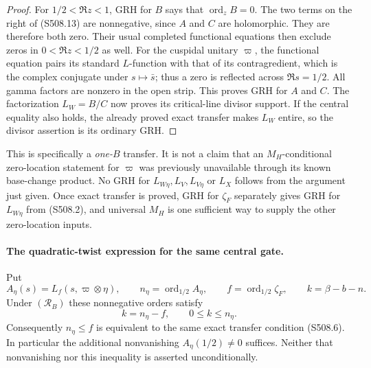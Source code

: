 \begin{proof}
For $1/2<\Re z<1$, GRH for $B$ says that
$\operatorname{ord}_z B=0$.  The two terms on the right of
(S508.13) are nonnegative, since $A$ and $C$ are holomorphic.
They are therefore both zero.  Their usual completed functional
equations then exclude zeros in $0<\Re z<1/2$ as well.
For the cuspidal unitary $\varpi$, the functional equation
pairs its standard $L$-function with that of its contragredient,
which is the complex conjugate under $s\mapsto\bar s$;
thus a zero is reflected across $\Re s=1/2$.
All gamma factors are nonzero in the open strip.  This proves
GRH for $A$ and $C$.  The factorization $L_W=B/C$ now proves
its critical-line divisor support.  If the central equality
also holds, the already proved exact transfer makes $L_W$
entire, so the divisor assertion is its ordinary GRH.
\end{proof}

This is specifically a \emph{one-$B$} transfer.  It is not a
claim that an $M_H$-conditional zero-location statement for
$\varpi$ was previously unavailable through its known base-change
product.  No GRH for $L_{W\eta},L_V,L_{V\eta}$ or $L_X$ follows
from the argument just given.  Once exact transfer is proved,
GRH for $\zeta_F$ separately gives GRH for $L_{W\eta}$ from
(S508.2), and universal $M_H$ is one sufficient way to supply
the other zero-location inputs.

\paragraph{The quadratic-twist expression for the same central gate.}
Put
\[
 A_\eta(s)=L_f(s,\varpi\otimes\eta),\qquad
 n_\eta=\operatorname{ord}_{1/2}A_\eta,
 \qquad f=\operatorname{ord}_{1/2}\zeta_F,
 \qquad k=\beta-b-n.
\]
Under $(\mathcal R_B)$ these nonnegative orders satisfy
\[
             k=n_\eta-f,\qquad 0\le k\le n_\eta.
 \tag{S508.14}
\]
Consequently $n_\eta\le f$ is equivalent to the same exact
transfer condition (S508.6).  In particular the additional
nonvanishing $A_\eta(1/2)\ne0$ suffices.  Neither that
nonvanishing nor this inequality is asserted unconditionally.

